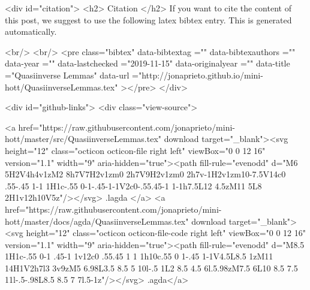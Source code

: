   
  <div id="citation">
  <h2> Citation </h2>
  If you want to cite the content of this post,
  we suggest to use the following latex bibtex entry.
  This is generated automatically.

  <br/>
  <br/>
  <pre class="bibtex"
       data-bibtextag =""
       data-bibtexauthors =""
       data-year =""
       data-lastchecked ="2019-11-15"
       data-originalyear =""
       data-title ="Quasiinverse Lemmas"
       data-url ="http://jonaprieto.github.io/mini-hott/QuasiinverseLemmas.tex"
  ></pre>
  </div>
  

  <div id="github-links">
    <div class="view-source">
      
        <a href="https://raw.githubusercontent.com/jonaprieto/mini-hott/master/src/QuasiinverseLemmas.tex" download target="_blank"><svg height="12" class="octicon octicon-file right left" viewBox="0 0 12 16" version="1.1" width="9" aria-hidden="true"><path fill-rule="evenodd" d="M6 5H2V4h4v1zM2 8h7V7H2v1zm0 2h7V9H2v1zm0 2h7v-1H2v1zm10-7.5V14c0 .55-.45 1-1 1H1c-.55 0-1-.45-1-1V2c0-.55.45-1 1-1h7.5L12 4.5zM11 5L8 2H1v12h10V5z"/></svg> .lagda </a>
        <a href="https://raw.githubusercontent.com/jonaprieto/mini-hott/master/docs/agda/QuasiinverseLemmas.tex" download target="_blank"><svg height="12" class="octicon octicon-file-code right left" viewBox="0 0 12 16" version="1.1" width="9" aria-hidden="true"><path fill-rule="evenodd" d="M8.5 1H1c-.55 0-1 .45-1 1v12c0 .55.45 1 1 1h10c.55 0 1-.45 1-1V4.5L8.5 1zM11 14H1V2h7l3 3v9zM5 6.98L3.5 8.5 5 10l-.5 1L2 8.5 4.5 6l.5.98zM7.5 6L10 8.5 7.5 11l-.5-.98L8.5 8.5 7 7l.5-1z"/></svg> .agda</a>
      
